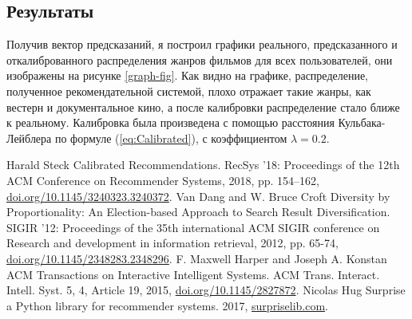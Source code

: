 \documentclass[a4paper,article,14pt]{extarticle}
\begin{document}
\subsection{Результаты}
Получив вектор предсказаний, я построил графики реального, предсказанного и откалиброванного распределения жанров фильмов для всех пользователей, они изображены на рисунке \ref{graph-fig}. 
Как видно на графике, распределение, полученное рекомендательной системой, плохо отражает такие жанры, как вестерн и документальное кино, а после калибровки распределение стало ближе к реальному. 
Калибровка была произведена с помощью расстояния Кульбака-Лейблера по формуле (\ref{eq:Calibrated}), с коэффициентом $\lambda=0.2$.


  \pagebreak

\begin{thebibliography}{1}
 Harald Steck \flqq Calibrated Recommendations\frqq. RecSys '18: Proceedings of the 12th ACM Conference on Recommender Systems, 2018, pp. 154–162, \href{https://doi.org/10.1145/3240323.3240372}{doi.org/10.1145/3240323.3240372}.
 Van Dang and W. Bruce Croft \flqq Diversity by Proportionality: An Election-based Approach to Search Result Diversification\frqq. SIGIR '12: Proceedings of the 35th international ACM SIGIR conference on Research and development in information retrieval, 2012, pp. 65-74, \href{https://doi.org/10.1145/2348283.2348296}{doi.org/10.1145/2348283.2348296}.
 F. Maxwell Harper and Joseph A. Konstan \flqq ACM Transactions on Interactive Intelligent Systems\frqq. ACM Trans. Interact. Intell. Syst. 5, 4, Article 19, 2015, \href{https://doi.org/10.1145/2827872}{doi.org/10.1145/2827872}.
 Nicolas Hug \flqq Surprise a Python library for recommender systems\frqq. 2017, \href{http://surpriselib.com}{surpriselib.com}.
\end{thebibliography}
\end{document}
